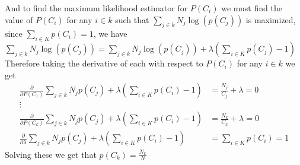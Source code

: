 \documentclass[12pt]{article}
\begin{document}
And to find the maximum likelihood estimator for $P(C_i)$ we must find the value of $P(C_i)$ for any $i\in k$ such that 
$\sum_{j \in k} N_j\log(p(C_j))$ is maximized, since $\sum_{i\in K}p(C_i)=1$, we have $\sum_{j \in k} N_j\log(p(C_j))=\sum_{j \in k} N_j\log(p(C_j))+\lambda(\sum_{i\in K}p(C_j)-1)$
Therefore taking the derivative of each with respect to $P(C_i)$ for any $i\in k$ we get
\begin{align*}
    \frac{\partial }{\partial P(C_1)}\sum_{j \in k} N_jp(C_j)+\lambda(\sum_{i\in K}p(C_i)-1)&=\frac{N_j}{C_j}+\lambda=0\\
    \vdots \\
    \frac{\partial }{\partial P(C_k)}\sum_{j \in k} N_jp(C_j)+\lambda(\sum_{i\in K}p(C_i)-1)&=\frac{N_k}{C_k}+\lambda=0\\
    \frac{\partial }{\partial \lambda}\sum_{j \in k} N_jp(C_j)+\lambda(\sum_{i\in K}p(C_i)-1)&=\sum_{i\in K}p(C_i)=1
\end{align*}
Solving these we get that $p(C_k)=\boxed{\frac{N_k}{N}}$
\end{document}
